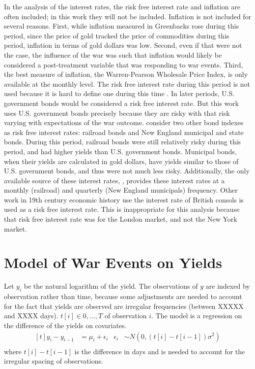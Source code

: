 In the analysis of the interest rates, the risk free interest rate and inflation are often included; in this work they will not be included.
Inflation is not included for several reasons.
First, while inflation measured in Greenbacks rose during this period, since the price of gold tracked the price of commodities during this period, inflation in terms of gold dollars was low\parencites{Mitchell1903}{Mitchell1908}. 
Second, even if that were not the case, the influence of the war was such that inflation would likely be considered a post-treatment variable that was responding to war events.
Third, the best measure of inflation, the Warren-Pearson Wholesale Price Index, is only available at the monthly level.
The risk free interest rate during this period is not used because it is hard to define one during this time \parencites{HomerSylla2005}.
In later periods, U.S. government bonds would be considered a risk free interest rate.
But this work uses U.S. government bonds precisely because they are risky with that risk varying with expectations of the war outcome.
\textcites{Macaulay1938}{HomerSylla2005} consider two other bond indexes as risk free interest rates: railroad bonds and New England municipal and state bonds.
During this period, railroad bonds were still relatively risky during this period, and had higher yields than U.S. government bonds.
Municipal bonds, when their yields are calculated in gold dollars, have yields similar to those of U.S. government bonds, and thus were not much less risky.
Additionally, the only available source of these interest rates, \textcite{Macaulay1938}, provides these interest rates at a monthly (railroad) and quarterly (New England municipals) frequency.
Other work in 19th century economic history use the interest rate of British consols is used as a risk free interest rate.
This is inappropriate for this analysis because that risk free interest rate was for the London market, and not the New York market.



\section{Model of War Events on Yields}

Let $y_{i}$ be the natural logarithm of the yield.
The observations of $y$ are indexed by observation rather than time, because some adjustments are needed to account for the fact that yields are observed are irregular frequencies (between XXXXX and XXXX days).
$t[i] \in 0, \dots, T$ of observation $i$.
The model is a regression on the difference of the yields on covariates.
\begin{equation}
  \label{eq:1}
  \begin{aligned}[t]
    y_{i} - y_{i - 1} &= \mu_{i} + \epsilon_{i} & \epsilon_{i} & \sim N(0, (t[i] - t[i - 1]) \sigma^{2}) \\
  \end{aligned}
\end{equation}
where $t[i] - t[i - 1]$ is the difference in days and is needed to account for the irregular spacing of observations.

